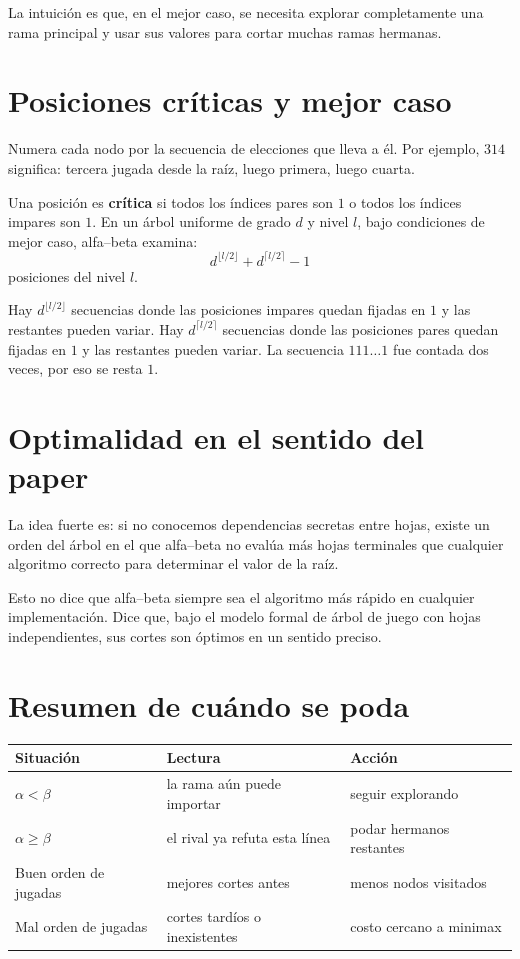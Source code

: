 \documentclass[11pt,a4paper]{article}
\theoremstyle{definition}
\begin{document}
La intuición es que, en el mejor caso, se necesita explorar completamente una rama principal y usar sus valores para cortar muchas ramas hermanas.

\section{Posiciones críticas y mejor caso}

Numera cada nodo por la secuencia de elecciones que lleva a él. Por ejemplo, $314$ significa: tercera jugada desde la raíz, luego primera, luego cuarta.

Una posición es \textbf{crítica} si todos los índices pares son $1$ o todos los índices impares son $1$. En un árbol uniforme de grado $d$ y nivel $l$, bajo condiciones de mejor caso, alfa--beta examina:
\[
d^{\lfloor l/2\rfloor}+d^{\lceil l/2\rceil}-1
\]
posiciones del nivel $l$.

\begin{proofbox}
Hay $d^{\lfloor l/2\rfloor}$ secuencias donde las posiciones impares quedan fijadas en $1$ y las restantes pueden variar. Hay $d^{\lceil l/2\rceil}$ secuencias donde las posiciones pares quedan fijadas en $1$ y las restantes pueden variar. La secuencia $111\ldots1$ fue contada dos veces, por eso se resta $1$.
\end{proofbox}

\section{Optimalidad en el sentido del paper}

La idea fuerte es: si no conocemos dependencias secretas entre hojas, existe un orden del árbol en el que alfa--beta no evalúa más hojas terminales que cualquier algoritmo correcto para determinar el valor de la raíz.

\begin{idea}
Esto no dice que alfa--beta siempre sea el algoritmo más rápido en cualquier implementación. Dice que, bajo el modelo formal de árbol de juego con hojas independientes, sus cortes son óptimos en un sentido preciso.
\end{idea}

\section{Resumen de cuándo se poda}

\begin{center}
\begin{tabular}{lll}
\hline
Situación & Lectura & Acción \\
\hline
$\alpha<\beta$ & la rama aún puede importar & seguir explorando \\
$\alpha\ge\beta$ & el rival ya refuta esta línea & podar hermanos restantes \\
Buen orden de jugadas & mejores cortes antes & menos nodos visitados \\
Mal orden de jugadas & cortes tardíos o inexistentes & costo cercano a minimax \\
\hline
\end{tabular}
\end{center}
\end{document}
